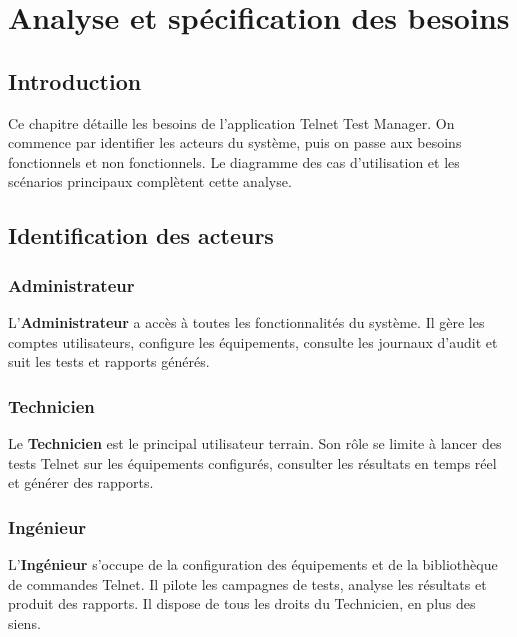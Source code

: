 \chapter{Analyse et spécification des besoins}

\section{Introduction}

Ce chapitre détaille les besoins de l'application Telnet Test Manager.
On commence par identifier les acteurs du système, puis on passe aux
besoins fonctionnels et non fonctionnels. Le diagramme des cas
d'utilisation et les scénarios principaux complètent cette analyse.

\section{Identification des acteurs}

\subsection{Administrateur}

L'\textbf{Administrateur} a accès à toutes les fonctionnalités du
système. Il gère les comptes utilisateurs, configure les équipements,
consulte les journaux d'audit et suit les tests et rapports générés.

\subsection{Technicien}

Le \textbf{Technicien} est le principal utilisateur terrain. Son rôle
se limite à lancer des tests Telnet sur les équipements configurés,
consulter les résultats en temps réel et générer des rapports.

\subsection{Ingénieur}

L'\textbf{Ingénieur} s'occupe de la configuration des équipements et
de la bibliothèque de commandes Telnet. Il pilote les campagnes de
tests, analyse les résultats et produit des rapports. Il dispose de
tous les droits du Technicien, en plus des siens.

